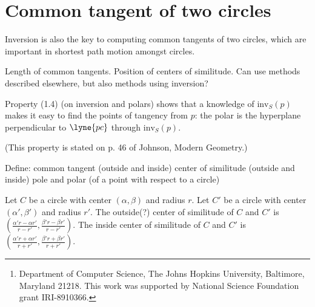 \newif\ifFull
\Fullfalse
{} 

% 

\newtheorem{defn2}{Definition}



\title{}
\author{John K. Johnstone\thanks{Department of Computer Science, The Johns 
	Hopkins University, Baltimore, Maryland 21218.
	This work was supported by National Science Foundation grant
	IRI-8910366.}}
\date{\today}

\maketitle

\SingleSpace


\section{Common tangent of two circles}

Inversion is also the key to computing common tangents of two circles,
which are important in shortest path motion amongst circles.

Length of common tangents.
Position of centers of similitude.
Can use methods described elsewhere, but also methods using inversion?

\noindent Property (1.4) (on inversion and polars) shows 
that a knowledge of $\mbox{inv}_{S}(p)$ 
makes it easy to find the points of tangency from $p$: 
the polar is the hyperplane perpendicular to $\lyne{pc}$ through 
$\mbox{inv}_{S}(p)$.

(This property is stated on p. 46 of Johnson, Modern Geometry.)


Define: common tangent (outside and inside)
	center of similitude (outside and inside)
	pole and polar (of a point with respect to a circle)

\begin{lemma}
\label{lem-similitude}
\cite[p. 105?]{SalmonConicSections}
Let $C$ be a circle with center $(\alpha,\beta)$ 
and radius $r$.
Let $C'$ be a circle with center $(\alpha',\beta')$ 
and radius $r'$.
The outside(?) 
center of similitude of $C$ and $C'$ is
$(\frac{\alpha'r - \alpha r'}{r - r'},
  \frac{\beta'r - \beta r'}{r - r'})$.
The inside center of similitude of $C$ and $C'$ is
$(\frac{\alpha'r + \alpha r'}{r + r'},
  \frac{\beta'r + \beta r'}{r + r'})$.
\end{lemma}
\QED

